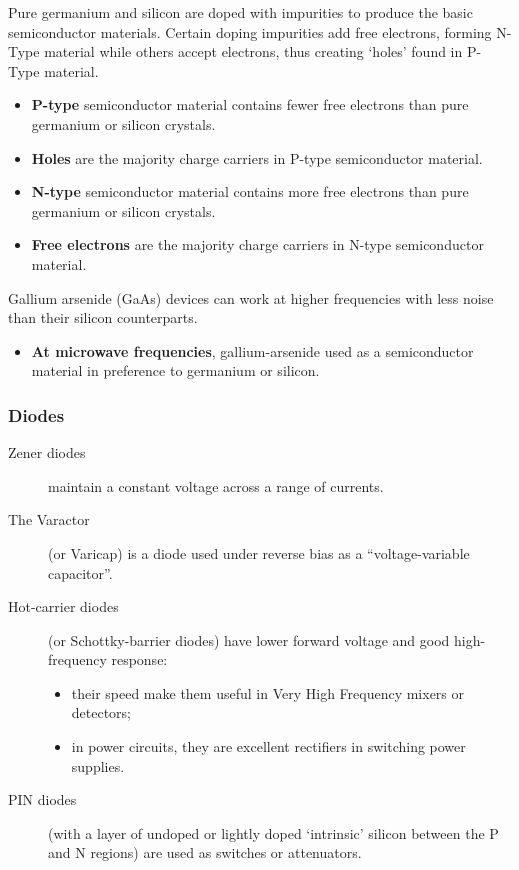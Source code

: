 \documentclass[letterpaper]{article}
\begin{document}
        Pure germanium and silicon are doped with impurities to produce the basic semiconductor materials.
        Certain doping impurities add free electrons, forming N-Type material while others accept electrons, thus creating `holes' found in P-Type material.
        \begin{itemize}
            \item \textbf{P-type} semiconductor material contains fewer free electrons than pure germanium or silicon crystals.
            \item \textbf{Holes} are the majority charge carriers in P-type semiconductor material.
            \item \textbf{N-type} semiconductor material contains more free electrons than pure germanium or silicon crystals.
            \item \textbf{Free electrons} are the majority charge carriers in N-type semiconductor material.
        \end{itemize}

        Gallium arsenide (GaAs) devices can work at higher frequencies with less noise than their silicon counterparts.
        \begin{itemize}
            \item \textbf{At microwave frequencies}, gallium-arsenide used as a semiconductor material in preference to germanium or silicon.
        \end{itemize}

        \subsubsection{Diodes}
        \begin{description}
            \item[Zener diodes] maintain a constant voltage across a range of currents.
            \item[The Varactor] (or Varicap) is a diode used under reverse bias as a ``voltage-variable capacitor''.
            \item[Hot-carrier diodes] (or Schottky-barrier diodes) have lower forward voltage and good high-frequency response:
                \begin{itemize}
                    \item their speed make them useful in Very High Frequency mixers or detectors;
                    \item in power circuits, they are excellent rectifiers in switching power supplies.
                \end{itemize}
            \item[PIN diodes] (with a layer of undoped or lightly doped `intrinsic' silicon between the P and N regions) are used as switches or attenuators.
        \end{description}
\end{document}
